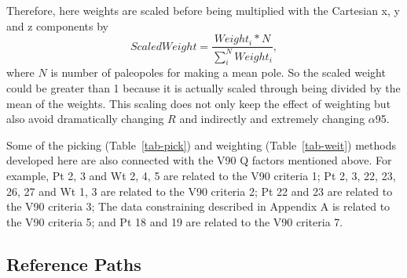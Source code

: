 Therefore, here weights are scaled before being multiplied with the Cartesian
x, y and z components by
%
\begin{equation*}
  ScaledWeight=\frac{Weight_i * N}{\sum_{i}^{N} Weight_i},
\end{equation*}
%
where $N$ is number of paleopoles for making a mean pole. So the scaled weight
could be greater than 1 because it is actually scaled through being divided by
the mean of the weights. This scaling does not only keep the effect of weighting
but also avoid dramatically changing $R$ and indirectly and extremely changing
$\alpha$95.

Some of the picking (Table~\ref{tab-pick}) and weighting
(Table~\ref{tab-weit}) methods developed here are also connected with the V90 Q
factors mentioned above. For example, Pt 2, 3 and Wt 2, 4, 5 are related to the
V90 criteria 1; Pt 2, 3, 22, 23, 26, 27 and Wt 1, 3 are related to the V90
criteria 2; Pt 22 and 23 are related to the V90 criteria 3; The data
constraining described in Appendix A is related to the V90 criteria 5; and Pt 18
and 19 are related to the V90 criteria 7.

\subsection{Reference Paths}

